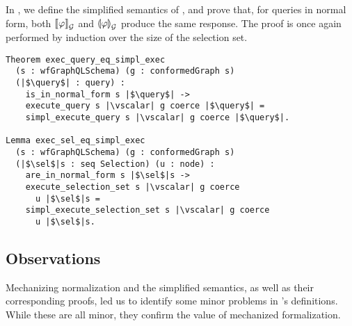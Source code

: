 In \gcoql, we define the simplified semantics of \HP, and prove that, for queries in normal form, both $\llbracket \varphi \rrbracket^{}_{\mathcal{G}}$ and $\llparenthesis \varphi \rrparenthesis^{}_{\mathcal{G}}$ produce the same response. 
%
The proof is once again performed by induction over the size of the selection set.
\begin{verbatim}
Theorem exec_query_eq_simpl_exec 
  (s : wfGraphQLSchema) (g : conformedGraph s)
  (|$\query$| : query) : 
    is_in_normal_form s |$\query$| -> 
    execute_query s |\vscalar| g coerce |$\query$| =
    simpl_execute_query s |\vscalar| g coerce |$\query$|.
    
Lemma exec_sel_eq_simpl_exec
  (s : wfGraphQLSchema) (g : conformedGraph s) 
  (|$\sel$|s : seq Selection) (u : node) :
    are_in_normal_form s |$\sel$|s -> 
    execute_selection_set s |\vscalar| g coerce
      u |$\sel$|s = 
    simpl_execute_selection_set s |\vscalar| g coerce
      u |$\sel$|s.     
\end{verbatim}

 
\subsection{Observations}\label{subsec:norm_lims}

Mechanizing normalization and the simplified semantics, as well as their corresponding proofs, led us to identify some minor problems in \HP's definitions. While these are all minor, they confirm the value of mechanized formalization.

